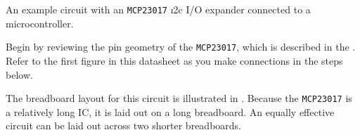 \begin{marginfigure}
\begin{center}
		\caption[\i2c I/O expander on a breadboard]{An example circuit with an \texttt{MCP23017} \i2c I/O expander connected to a microcontroller. }
	\end{center}
\end{marginfigure}
Begin by reviewing the pin geometry of the \texttt{MCP23017}, which is described in the .
Refer to the first figure in this datasheet as you make connections in the steps below.

The breadboard layout for this circuit is illustrated in .
Because the \texttt{MCP23017} is a relatively long IC, it is laid out on a long breadboard.
An equally effective circuit can be laid out across two shorter breadboards.

